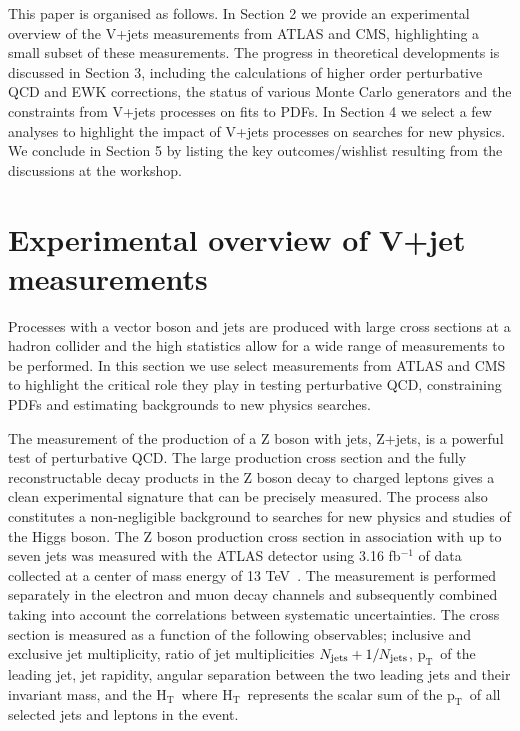 \documentclass[a4paper,11pt,notoc]{article}
\newcommand{\pt}{\ensuremath{\mathrm{p_T}}}
\newcommand{\Ht}{\ensuremath{\mathrm{H_T}}}
\begin{document}
This paper is organised as follows. In Section 2 we provide an experimental overview of the V+jets measurements from ATLAS and CMS, highlighting a small subset of these measurements. The progress in theoretical developments is discussed in Section 3, including the calculations of higher order perturbative QCD and EWK corrections, the status of various Monte Carlo generators and the constraints from V+jets processes on fits to PDFs. In Section 4 we select a few analyses to highlight the impact of V+jets processes on searches for new physics. We conclude in Section 5 by listing the key outcomes/wishlist resulting from the discussions at the workshop.




\section{Experimental overview of V+jet measurements}
Processes with a vector boson and jets are produced with large cross sections at a hadron collider and the high statistics allow for a wide range of measurements to be performed. In this section we use select measurements from ATLAS and CMS to highlight the critical role they play in testing perturbative QCD, constraining PDFs and estimating backgrounds to new physics searches. 

The measurement of the production of a Z boson with jets, Z+jets, is a powerful test of perturbative QCD. The large production cross section and the fully reconstructable decay products in the Z boson decay to charged leptons gives a clean experimental signature that can be precisely measured. The process also constitutes a non-negligible background to searches for new physics and studies of the Higgs boson.
The Z boson production cross section in association with up to seven jets was measured with the ATLAS detector using 3.16 fb$^{-1}$ of data collected at a center of mass energy of 13 TeV~\cite{Aaboud:2017hbk}. The measurement is performed separately in the electron and muon decay channels and subsequently combined taking into account the correlations between systematic uncertainties. The cross section is measured as a function of the following observables; inclusive and exclusive jet multiplicity, ratio of jet multiplicities $N_{\rm jets}+1/N_{\rm jets}$, \pt\ of the leading jet, jet rapidity, angular separation between the two leading jets and their invariant mass, and the \Ht\, where \Ht\ represents the scalar sum of the \pt\ of all selected jets and leptons in the event. 
\end{document}
